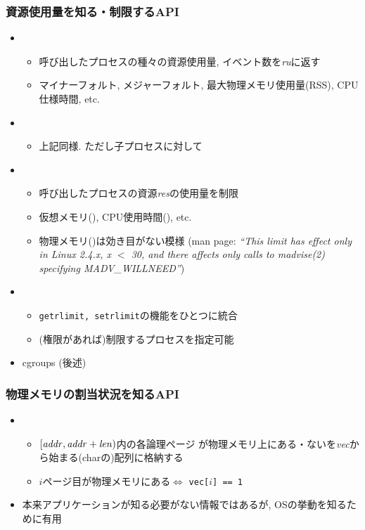 \documentclass[12pt,dvipdfmx]{beamer}
\begin{document}
\begin{frame}
  \frametitle{資源使用量を知る・制限するAPI}
  \begin{itemize}
  \item {}
    \begin{itemize}
    \item 呼び出したプロセスの種々の資源使用量, イベント数を{\it ru}に返す
    \item マイナーフォルト, メジャーフォルト,
      最大物理メモリ使用量(RSS), CPU仕様時間, etc.
    \end{itemize}
  \item {}
    \begin{itemize}
    \item 上記同様. ただし子プロセスに対して
    \end{itemize}
  \item {}
    \begin{itemize}
    \item 呼び出したプロセスの資源{\it res}の使用量を制限
    \item 仮想メモリ(), CPU使用時間(), etc.
    \item 物理メモリ()は効き目がない模様
      (man page: {\it{\scriptsize ``This limit has effect only in Linux 2.4.x, x $<$ 30,
        and there affects only calls to madvise(2) specifying MADV\_WILLNEED''}})
    \end{itemize}
    
  \item {}
    \begin{itemize}
    \item {\tt getrlimit, setrlimit}の機能をひとつに統合
    \item (権限があれば)制限するプロセスを指定可能
    \end{itemize}

  \item cgroups (後述)
  \end{itemize}
\end{frame}

\begin{frame}
  \frametitle{物理メモリの割当状況を知るAPI}
  \begin{itemize}
  \item {}
    \begin{itemize}
    \item $[{\it addr}, {\it addr+len})$内の各論理ページ
      が物理メモリ上にある・ないを{\it vec}から始まる(charの)配列に格納する
    \item $i$ページ目が物理メモリにある$\iff$ {\tt vec[$i$] == 1}
    \end{itemize}
  \item 本来アプリケーションが知る必要がない情報ではあるが,
    OSの挙動を知るために有用
  \end{itemize}
\end{frame}
\end{document}
